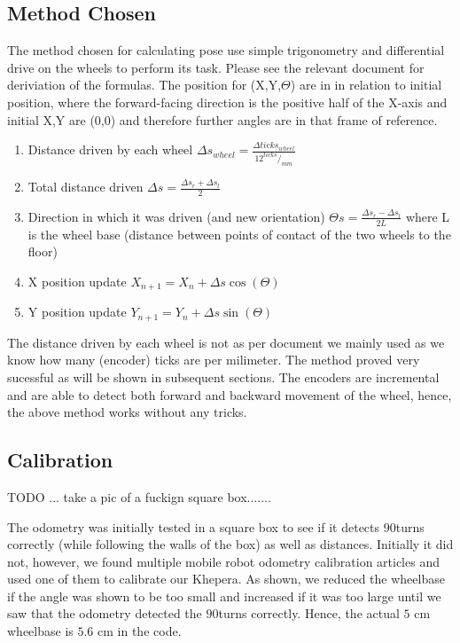 \documentclass[11pt, a4paper]{article}
\begin{document}
\subsection{Method Chosen}

The method chosen for calculating pose\cite{odo_used} use simple trigonometry and differential drive on 
the wheels to perform its task. Please see the relevant document for deriviation of the formulas. The position for 
(X,Y,$\Theta$) are in in relation to initial position, where the forward-facing direction is the positive half of the
X-axis and initial X,Y are ($0$,$0$) and therefore further angles are in that frame of reference.

\begin{enumerate}

	\item Distance driven by each wheel $\Delta s_{wheel} = \frac {\Delta ticks_{wheel} } {12 ^{ticks}/_{mm}} $
	\item Total distance driven $ \Delta s = \frac{\Delta s_{r} + \Delta s_{l} }{2}$
	\item Direction in which it was driven (and new orientation) $\Theta s = \frac{ \Delta s_{r} - \Delta s_{l} }{2L}$ where L is the wheel base 
	(distance between points of contact of the two wheels to the floor)
	\item X position update $X_{n+1} = X_{n} + \Delta s \cos (\Theta)$
	\item Y position update $Y_{n+1} = Y_{n} + \Delta s \sin (\Theta)$


\end{enumerate}


The distance driven by each wheel is not as per document we mainly used as we know 
how many (encoder) ticks are per milimeter. The method proved very sucessful as 
will be shown in subsequent sections. The encoders are incremental and are able to 
detect both forward and backward movement of the wheel, hence, the above method works 
without any tricks.

\subsection{Calibration}

TODO ... take a pic of a fuckign square box.......

The odometry was initially tested in a square box to see if it detects $90$\degree turns correctly 
(while following the walls of the box) as well as distances. Initially it did not, however, we 
found multiple mobile robot odometry calibration articles and used one of them\cite{odo_calibration}
 to calibrate our Khepera. As shown, we reduced the wheelbase if the angle was shown to be too small 
and increased if it was too large until we saw that the odometry detected the  $90$\degree turns correctly. 
Hence, the actual $5$ cm wheelbase is $5.6$ cm in the code.
\end{document}
